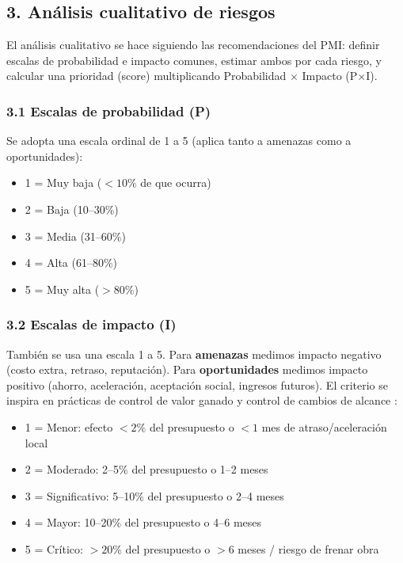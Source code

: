 
\subsection{3. Análisis cualitativo de riesgos}

El análisis cualitativo se hace siguiendo las recomendaciones del PMI: definir escalas de probabilidad e impacto comunes, estimar ambos por cada riesgo, y calcular una prioridad (score) multiplicando Probabilidad $\times$ Impacto (P$\times$I). \cite{PMBOK}

\subsubsection*{3.1 Escalas de probabilidad (P)}

Se adopta una escala ordinal de 1 a 5 (aplica tanto a amenazas como a oportunidades):

\begin{itemize}
  \item 1 = Muy baja ($<10\%$ de que ocurra)
  \item 2 = Baja (10--30\%)
  \item 3 = Media (31--60\%)
  \item 4 = Alta (61--80\%)
  \item 5 = Muy alta ($>80\%$)
\end{itemize}

\subsubsection*{3.2 Escalas de impacto (I)}

También se usa una escala 1 a 5. Para \textbf{amenazas} medimos impacto negativo (costo extra, retraso, reputación). Para \textbf{oportunidades} medimos impacto positivo (ahorro, aceleración, aceptación social, ingresos futuros). El criterio se inspira en prácticas de control de valor ganado y control de cambios de alcance \cite{PMBOK}:

\begin{itemize}
  \item 1 = Menor: efecto $<2\%$ del presupuesto o $<1$ mes de atraso/aceleración local
  \item 2 = Moderado: 2--5\% del presupuesto o 1--2 meses
  \item 3 = Significativo: 5--10\% del presupuesto o 2--4 meses
  \item 4 = Mayor: 10--20\% del presupuesto o 4--6 meses
  \item 5 = Crítico: $>20\%$ del presupuesto o $>6$ meses / riesgo de frenar obra
\end{itemize}

